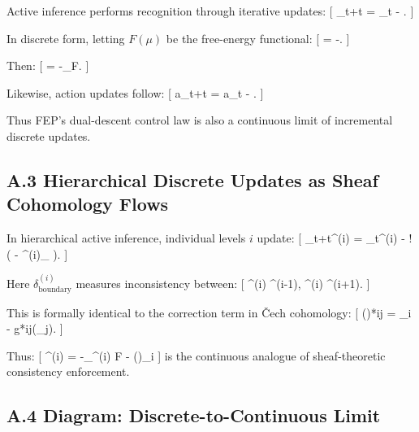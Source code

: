 \documentclass[11pt,a4paper,twoside]{article}
\begin{document}
Active inference performs recognition through iterative updates:
[
\mu_{t+\Delta t} = \mu_t - \eta {}.
]

In discrete form, letting $F(\mu)$ be the free-energy functional:
[
\Delta \mu = -\eta {}.
]

Then:
[
 \to \dot{\mu} = -\nabla_\mu F.
]

Likewise, action updates follow:
[
a_{t+\Delta t} = a_t - \eta {}.
]

Thus FEP’s dual-descent control law is also a continuous limit of incremental discrete updates.

\subsection*{A.3 Hierarchical Discrete Updates as Sheaf Cohomology Flows}

In hierarchical active inference, individual levels $i$ update:
[
\mu_{t+\Delta t}^{(i)} = \mu_t^{(i)} - \eta!
\left(
 - \delta^{(i)}_{}
\right).
]

Here $\delta^{(i)}_{\mathrm{boundary}}$ measures inconsistency between:
[
\mu^{(i)} \longrightarrow \mu^{(i-1)}, \qquad
\mu^{(i)} \longrightarrow \mu^{(i+1)}.
]

This is formally identical to the correction term in \v{C}ech cohomology:
[
\delta(\sigma)*{ij} = \sigma_i - g*{ij}(\sigma_j).
]

Thus:
[
\dot{\mu}^{(i)} = -\nabla_{\mu^{(i)}} F - \delta(\sigma)_{i}
]
is the continuous analogue of sheaf-theoretic consistency enforcement.

\subsection*{A.4 Diagram: Discrete-to-Continuous Limit}

\begin{center}
\end{center}
\end{document}
